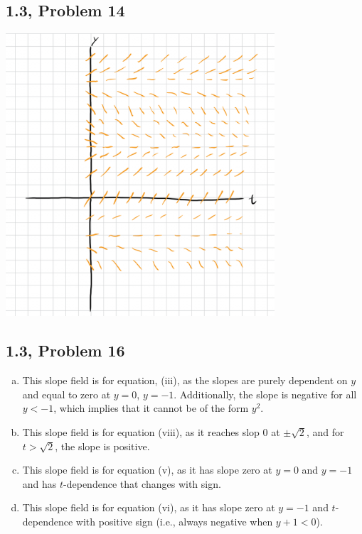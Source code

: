 \documentclass[10pt]{mypackage}
\begin{document}
\subsection{1.3, Problem 14}%
\begin{center}
  \includegraphics[width=10cm]{images/1_3_14.png}
\end{center}
\subsection{1.3, Problem 16}%
\begin{enumerate}[(a)]
  \item This slope field is for equation, (iii), as the slopes are purely dependent on $y$ and equal to zero at $y=0$, $y=-1$. Additionally, the slope is negative for all $y < -1$, which implies that it cannot be of the form $y^2$.
  \item This slope field is for equation (viii), as it reaches slop $0$ at $\pm \sqrt{2}$, and for $t > \sqrt{2}$, the slope is positive.
  \item This slope field is for equation (v), as it has slope zero at $y=0$ and $y=-1$ and has $t$-dependence that changes with sign.
  \item This slope field is for equation (vi), as it has slope zero at $y=-1$ and $t$-dependence with positive sign (i.e., always negative when $y + 1 < 0$).
\end{enumerate}
\end{document}

